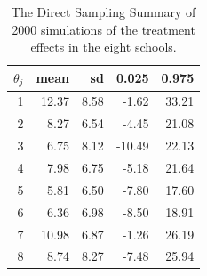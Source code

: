 \documentclass[a4paper, 9pt]{article}
\begin{document}
\begin{table}[h!]
\centering
\label{DSTheta}
\caption{The Direct Sampling Summary of 2000 simulations of the treatment effects in the eight schools.}
\begin{tabular}{rrrrr}
  \hline
$\theta_j $ & mean & sd & 0.025 & 0.975 \\ 
  \hline
1 & 12.37 & 8.58 & -1.62 & 33.21 \\ 
  2 & 8.27 & 6.54 & -4.45 & 21.08 \\ 
  3 & 6.75 & 8.12 & -10.49 & 22.13 \\ 
  4 & 7.98 & 6.75 & -5.18 & 21.64 \\ 
  5 & 5.81 & 6.50 & -7.80 & 17.60 \\ 
  6 & 6.36 & 6.98 & -8.50 & 18.91 \\ 
  7 & 10.98 & 6.87 & -1.26 & 26.19 \\ 
  8 & 8.74 & 8.27 & -7.48 & 25.94 \\ 
   \hline
\end{tabular}
\end{table}
\end{document}
